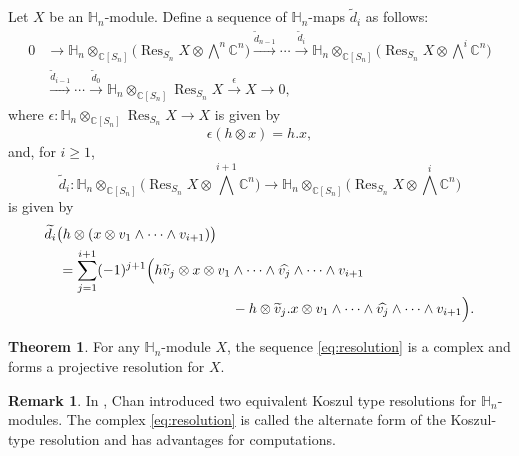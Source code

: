 \documentclass[11pt]{amsart}
\numberwithin{equation}{section}
\theoremstyle{definition}
\newtheorem{theorem}[thm]{Theorem}
\newtheorem{remark}[thm]{Remark}
\newcommand{\CC}{{\mathbb C}}
\newcommand{\Res}{\operatorname{Res}}
\begin{document}
Let $X$ be an $\mathbb{H}_{n}$-module. Define a sequence of $\mathbb{H}_{n}$-maps $\widetilde d_i$ as follows:
\begin{equation}\label{eq:resolution}
\begin{aligned}
0 &\longrightarrow
\mathbb{H}_{n}\otimes_{\CC[S_n]}\bigl(\Res_{S_{n}} X\otimes\textstyle\bigwedge^n \mathbb{C}^{n}\bigr)
\xrightarrow{\widetilde d_{n-1}}\cdots\xrightarrow{\widetilde d_i}
\mathbb{H}_{n}\otimes_{\CC[S_n]}\bigl(\Res_{S_n} X\otimes\textstyle\bigwedge^i \mathbb{C}^{n}\bigr)
\\
&\xrightarrow{\widetilde d_{i-1}}\cdots\xrightarrow{\widetilde d_0}
\mathbb{H}_{n}\otimes_{\CC[S_n]}\Res_{S_n} X
\xrightarrow{\epsilon}X\longrightarrow0,
\end{aligned}
\end{equation}
where $\epsilon\colon\mathbb{H}_{n}\otimes_{\CC[S_n]}\Res_{S_n} X\to X$ is given by
\begin{equation*}
   \epsilon(h\otimes x)=h.x, 
\end{equation*}
and, for $i\geq1$,
\begin{equation*}
  \widetilde d_i\colon
  \mathbb{H}_{n}\otimes_{\CC[S_n]}\bigl(\Res_{S_n} X\otimes\textstyle\bigwedge^{i+1}\mathbb{C}^{n}\bigr)
  \longrightarrow
  \mathbb{H}_{n}\otimes_{\CC[S_n]}\bigl(\Res_{S_n} X\otimes\textstyle\bigwedge^{i}\mathbb{C}^{n}\bigr)
\end{equation*}
is given by
\begin{align*}
&\widetilde d_i\bigl(h\otimes(x\otimes v_1\wedge\cdots\wedge v_{i+1})\bigr)
\\
&\quad=
\sum_{j=1}^{i+1}(-1)^{j+1}
\Bigl(
  h\widetilde v_j\otimes x\otimes
    v_1\wedge\cdots\wedge\widehat{v_j}\wedge\cdots\wedge v_{i+1}
\\[-2pt]
&\hspace{47mm}{}
  -h\otimes \widetilde v_j. x\otimes
    v_1\wedge\cdots\wedge\widehat{v_j}\wedge\cdots\wedge v_{i+1}
\Bigr).
\end{align*}

\begin{theorem}\cite[Theorem 3.4]{chan2016duality}
    For any $\mathbb{H}_{n}$-module $X$, the sequence \eqref{eq:resolution} is a complex and forms a projective resolution for $X$.
\end{theorem}

\begin{remark}
    In \cite{chan2016duality}, Chan introduced two equivalent Koszul type resolutions for $\mathbb{H}_{n}$-modules. The complex \eqref{eq:resolution} is called the alternate form of the Koszul-type resolution and has advantages for computations.
\end{remark}
\end{document}
